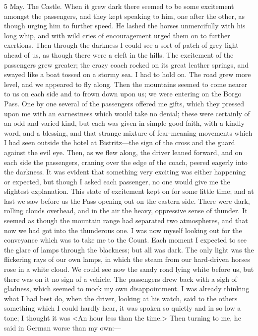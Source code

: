 \begin{diary}{5 May. The Castle.}
When it grew dark there seemed to be some excitement amongst the passengers, and they kept speaking to him, one after the other, as though urging him to further speed. He lashed the horses unmercifully with his long whip, and with wild cries of encouragement urged them on to further exertions. Then through the darkness I could see a sort of patch of grey light ahead of us, as though there were a cleft in the hills. The excitement of the passengers grew greater; the crazy coach rocked on its great leather springs, and swayed like a boat tossed on a stormy sea. I had to hold on. The road grew more level, and we appeared to fly along. Then the mountains seemed to come nearer to us on each side and to frown down upon us; we were entering on the Borgo Pass. One by one several of the passengers offered me gifts, which they pressed upon me with an earnestness which would take no denial; these were certainly of an odd and varied kind, but each was given in simple good faith, with a kindly word, and a blessing, and that strange mixture of fear-meaning movements which I had seen outside the hotel at Bistritz—the sign of the cross and the guard against the evil eye. Then, as we flew along, the driver leaned forward, and on each side the passengers, craning over the edge of the coach, peered eagerly into the darkness. It was evident that something very exciting was either happening or expected, but though I asked each passenger, no one would give me the slightest explanation. This state of excitement kept on for some little time; and at last we saw before us the Pass opening out on the eastern side. There were dark, rolling clouds overhead, and in the air the heavy, oppressive sense of thunder. It seemed as though the mountain range had separated two atmospheres, and that now we had got into the thunderous one. I was now myself looking out for the conveyance which was to take me to the Count. Each moment I expected to see the glare of lamps through the blackness; but all was dark. The only light was the flickering rays of our own lamps, in which the steam from our hard-driven horses rose in a white cloud. We could see now the sandy road lying white before us, but there was on it no sign of a vehicle. The passengers drew back with a sigh of gladness, which seemed to mock my own disappointment. I was already thinking what I had best do, when the driver, looking at his watch, said to the others something which I could hardly hear, it was spoken so quietly and in so low a tone; I thought it was <An hour less than the time.> Then turning to me, he said in German worse than my own:—


\end{diary}
